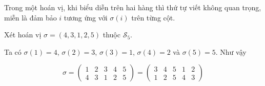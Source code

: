 \begin{remark}
    Trong một hoán vị, khi biểu diễn trên hai hàng thì thứ tự viết không quan trọng,
    miễn là đảm bảo $i$ tương ứng với $\sigma(i)$ trên từng cột.
\end{remark}

\begin{example}
    Xét hoán vị $\sigma = (4, 3, 1, 2, 5)$ thuộc $\mathcal{S}_5$.

    Ta có $\sigma(1) = 4$, $\sigma(2) = 3$, $\sigma(3) = 1$, $\sigma(4) = 2$
    và $\sigma(5) = 5$. Như vậy

    \begin{equation*}
        \sigma = 
        \begin{pmatrix}
            1 & 2 & 3 & 4 & 5 \\
            4 & 3 & 1 & 2 & 5
        \end{pmatrix} = 
        \begin{pmatrix}
            3 & 4 & 5 & 1 & 2 \\
            1 & 2 & 5 & 4 & 3
        \end{pmatrix}
    \end{equation*}
\end{example}